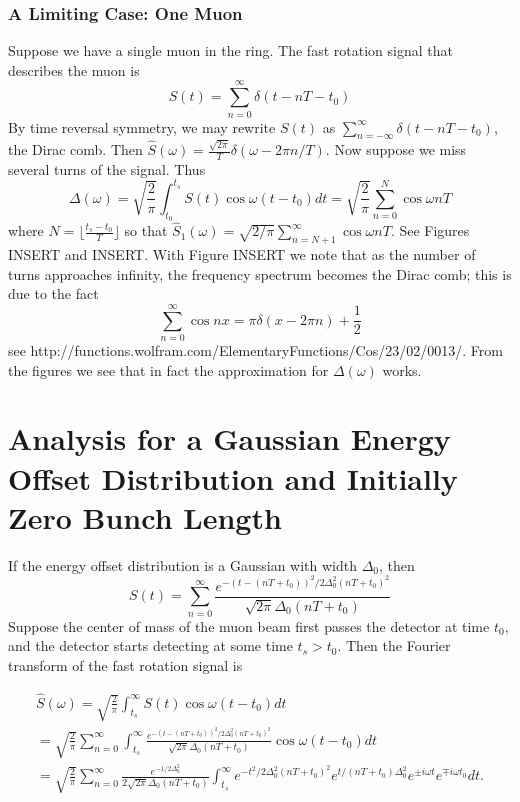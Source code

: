 \subsubsection{A Limiting Case: One Muon}

Suppose we have a single muon in the ring. The fast rotation signal that describes the muon is \[S(t)=\sum^{\infty}_{n=0}\delta(t-nT-t_0)\] By time reversal symmetry, we may rewrite $S(t)$ as $\sum^{\infty}_{n=-\infty}\delta(t-nT-t_0)$, the Dirac comb. Then $\hat{S}(\omega)=\frac{\sqrt{2\pi}}{T}\delta(\omega-2\pi n/T)$. Now suppose we miss several turns of the signal. Thus \[\Delta(\omega)=\sqrt{\frac{2}{\pi}}\int^{t_s}_{t_0}S(t)\cos\omega(t-t_0)dt=\sqrt{\frac{2}{\pi}}\sum^N_{n=0}\cos\omega nT\] where $N=\lfloor\frac{t_s-t_0}{T}\rfloor$ so that $\hat{S}_1(\omega)=\sqrt{2/\pi}\sum^{\infty}_{n=N+1}\cos\omega nT$. See Figures INSERT and INSERT. With Figure INSERT we note that as the number of turns approaches infinity, the frequency spectrum becomes the Dirac comb; this is due to the fact \[\sum^{\infty}_{n=0}\cos nx=\pi\delta(x-2\pi n)+\frac{1}{2}\] see http://functions.wolfram.com/ElementaryFunctions/Cos/23/02/0013/. From the figures we see that in fact the approximation for $\Delta(\omega)$ works.

\section{Analysis for a Gaussian Energy Offset Distribution and Initially Zero Bunch Length}

If the energy offset distribution is a Gaussian with width $\Delta_0$, then \[S(t)=\sum^{\infty}_{n=0}\frac{e^{-(t-(nT+t_0))^2/2\Delta^2_0(nT+t_0)^2}}{\sqrt{2\pi}\Delta_0(nT+t_0)}\] Suppose the center of mass of the muon beam first passes the detector at time $t_0$, and the detector starts detecting at some time $t_s>t_0$. Then the Fourier transform of the fast rotation signal is

\begin{gather}
\hat{S}(\omega)=\sqrt{\frac{2}{\pi}}\int^{\infty}_{t_s}S(t)\cos\omega(t-t_0) dt \nonumber \\
=\sqrt{\frac{2}{\pi}}\sum^{\infty}_{n=0}\int^{\infty}_{t_s}\frac{e^{-(t-(nT+t_0))^2/2\Delta^2_0(nT+t_0)^2}}{\sqrt{2\pi}\Delta_0(nT+t_0)}\cos\omega(t-t_0)dt \nonumber \\ 
=\sqrt{\frac{2}{\pi}}\sum^{\infty}_{n=0}\frac{e^{-1/2\Delta^2_0}}{2\sqrt{2\pi}\Delta_0(nT+t_0)}\int^{\infty}_{t_s}e^{-t^2/2\Delta^2_0(nT+t_0)^2}e^{t/(nT+t_0)\Delta^2_0}e^{\pm i\omega t}e^{\mp i\omega t_0}dt.
\end{gather}

